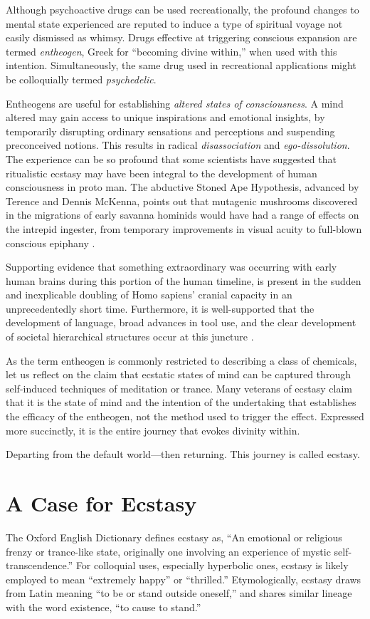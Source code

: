 \documentclass{UIdahoMastersThesis}
\begin{document}
Although psychoactive drugs can be used recreationally, the profound changes to mental state experienced are reputed to induce a type of spiritual voyage not easily dismissed as whimsy. Drugs effective at triggering conscious expansion are termed \textit{entheogen}, Greek for ``becoming divine within,'' when used with this intention. Simultaneously, the same drug used in recreational applications might be colloquially termed \textit{psychedelic}.

Entheogens are useful for establishing \textit{altered states of consciousness}. A mind altered may gain access to unique inspirations and emotional insights, by temporarily disrupting ordinary sensations and perceptions and suspending preconceived notions. This results in radical \textit{disassociation} and \textit{ego-dissolution}. The experience can be so profound that some scientists have suggested that ritualistic ecstasy may have been integral to the development of human consciousness in proto man. The abductive Stoned Ape Hypothesis, advanced by Terence and Dennis McKenna, points out that mutagenic mushrooms discovered in the migrations of early savanna hominids would have had a range of effects on the intrepid ingester, from temporary improvements in visual acuity to full-blown conscious epiphany \cite{mckenna_invisible_1993}.

Supporting evidence that something extraordinary was occurring with early human brains during this portion of the human timeline, is present in the sudden and inexplicable doubling of Homo sapiens' cranial capacity in an unprecedentedly short time. Furthermore, it is well-supported that the development of language, broad advances in tool use, and the clear development of societal hierarchical structures occur at this juncture \cite{mckenna_food_1992}.

As the term entheogen is commonly restricted to describing a class of chemicals, let us reflect on the claim that ecstatic states of mind can be captured through self-induced techniques of meditation or trance. Many veterans of ecstasy claim that it is the state of mind and the intention of the undertaking that establishes the efficacy of the entheogen, not the method used to trigger the effect. Expressed more succinctly, it is the entire journey that evokes divinity within. 

Departing from the default world---then returning. This journey is called ecstasy.


\section{A Case for Ecstasy}
The Oxford English Dictionary defines ecstasy as, ``An emotional or religious frenzy or trance-like state, originally one involving an experience of mystic self-transcendence.'' For colloquial uses, especially hyperbolic ones, ecstasy is likely employed to mean ``extremely happy'' or ``thrilled.'' Etymologically, ecstasy draws from Latin meaning ``to be or stand outside oneself,'' and shares similar lineage with the word existence, ``to cause to stand.''
 
\end{document}
